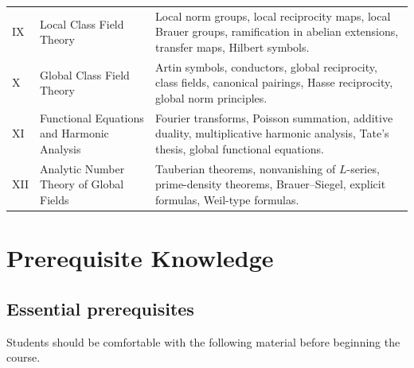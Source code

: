 \documentclass[11pt]{article}
\begin{document}
\begin{longtable}{p{}p{}p{}}
IX &
Local Class Field Theory &
Local norm groups, local reciprocity maps, local Brauer groups, ramification in abelian extensions, transfer maps, Hilbert symbols. \\

X &
Global Class Field Theory &
Artin symbols, conductors, global reciprocity, class fields, canonical pairings, Hasse reciprocity, global norm principles. \\

XI &
Functional Equations and Harmonic Analysis &
Fourier transforms, Poisson summation, additive duality, multiplicative harmonic analysis, Tate's thesis, global functional equations. \\

XII &
Analytic Number Theory of Global Fields &
Tauberian theorems, nonvanishing of $L$-series, prime-density theorems, Brauer--Siegel, explicit formulas, Weil-type formulas. \\
\bottomrule
\end{longtable}

\section{Prerequisite Knowledge}

\subsection*{Essential prerequisites}
Students should be comfortable with the following material before beginning the course.
\end{document}
